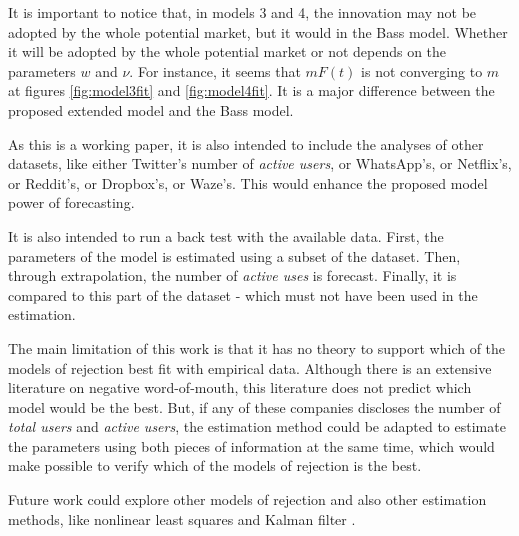 It is important to notice that, in models 3 and 4, the innovation may not be adopted by the whole potential market, but it would in the Bass model. Whether it will be adopted by the whole potential market or not depends on the parameters $w$ and $\nu$. For instance, it seems that $mF(t)$ is not converging to $m$ at figures \ref{fig:model3fit} and \ref{fig:model4fit}. It is a major difference between the proposed extended model and the Bass model.

As this is a working paper, it is also intended to include the analyses of other datasets, like either Twitter's number of \textit{active users}, or WhatsApp's, or Netflix's, or Reddit's, or Dropbox's, or Waze's. This would enhance the proposed model power of forecasting.

It is also intended to run a back test with the available data. First, the parameters of the model is estimated using a subset of the dataset. Then, through extrapolation, the number of \textit{active uses} is forecast. Finally, it is compared to this part of the dataset - which must not have been used in the estimation.

The main limitation of this work is that it has no theory to support which of the models of rejection best fit with empirical data. Although there is an extensive literature on negative word-of-mouth, this literature does not predict which model would be the best. But, if any of these companies discloses the number of \textit{total users} and \textit{active users}, the estimation method could be adapted to estimate the parameters using both pieces of information at the same time, which would make possible to verify which of the models of rejection is the best.

Future work could explore other models of rejection and also other estimation methods, like nonlinear least squares \citep{srinivasan1986technical} and Kalman filter \citep{xie1997kalman}.

